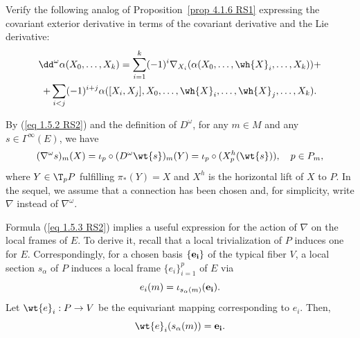 \begin{xca}
    Verify the following analog of Proposition~\ref{prop 4.1.6 RS1} expressing the covariant exterior derivative in terms of the covariant derivative and the Lie derivative:
        \begin{multline}
            \dd^\omega \alpha(X_0,\ldots,X_k)= \sum_{i=1}^k(-1)^i \nabla_{X_i}(\alpha(X_0,\ldots,\wh{X}_i,\ldots,X_k))+\\+\sum_{i<j}(-1)^{i+j}\alpha([X_i,X_j],X_0,\ldots,\wh{X}_i,\ldots,\wh{X}_j,\ldots,X_k).
        \end{multline}
\end{xca}

By (\ref{eq 1.5.2 RS2}) and the definition of $D^\omega$, for any $m\in M$ and any $s\in \Gamma^\infty(E)$, we have
\[(\nabla^\omega s)_m(X)=\iota_p\circ (D^\omega \wt{s})_m(Y)=\iota_p\circ (X_p^h(\wt{s})),\quad p\in P_m,\label{eq 1.5.3 RS2}\]
where $Y\in \T_pP$ fulfilling $\pi_\ast(Y)=X$ and $X^h$ is the horizontal lift of $X$ to $P$. In the sequel, we assume that a connection has been chosen and, for simplicity, write $\nabla$ instead of $\nabla^\omega$.

Formula (\ref{eq 1.5.3 RS2}) implies a useful expression for the action of $\nabla$ on the local frames of $E$. To derive it, recall that a local trivialization of $P$ induces one for $E$. Correspondingly, for a chosen basis $\{\bf{e}_i\}$ of the typical fiber $V$, a local section $s_\alpha$ of $P$ induces a local frame $\{e_i\}_{i=1}^p$ of $E$ via
\[e_i(m)=\iota_{s_\alpha(m)}(\bf{e}_i).\label{eq 1.5.4 RS2}\]
Let $\wt{e}_i:P\to V$ be the equivariant mapping corresponding to $e_i$. Then,
\[\wt{e}_i(s_\alpha(m))=\bf{e}_i.\label{eq 1.5.5 RS2}\]

